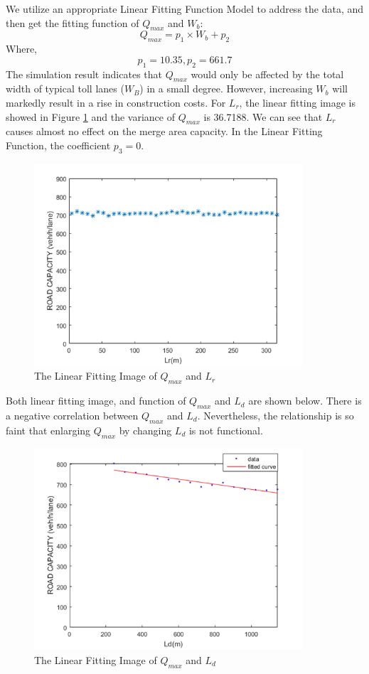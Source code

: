 \documentclass{mcmthesis}
\begin{document}
We utilize an appropriate Linear Fitting Function Model
to address the data, and then get the fitting function
of $Q_{max}$ and $W_b$:
$$Q_{max}=p_{1}\times W_b+p_2$$
Where, $$p_1 =10.35, p_2 = 661.7$$
The simulation result indicates that $Q_{max}$ would only
be affected by the total width of typical toll lanes
($W_B$) in a small degree. However, increasing $W_b$ will
markedly result in a rise in construction costs.
For $L_r$, the linear fitting image is showed in Figure \ref{fig6}
and the variance of $Q_{max}$ is 36.7188. We can see that
$L_r$ causes almost no effect on the merge area capacity.
In the Linear Fitting Function, the coefficient $p_3=0$.
\begin{figure}[h]
\small
\centering
\includegraphics[width=10cm]{figure6}
\caption{The Linear Fitting Image of $Q_{max}$ and $L_r$}\label{fig6}
\end{figure}

Both linear fitting image, and function of $Q_{max}$ and
$L_d$ are shown below. There is a negative correlation
between $Q_{max}$ and $L_d$. Nevertheless, the relationship
is so faint that enlarging $Q_{max}$ by changing $L_d$ is
not functional.
\begin{figure}[h]
\small
\centering
\includegraphics[width=10cm]{figure7}
\caption{The Linear Fitting Image of $Q_{max}$ and $L_d$}\label{fig7}
\end{figure}
\end{document}
